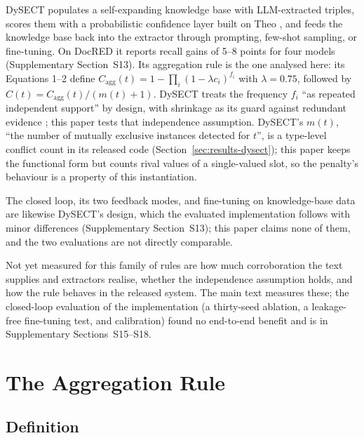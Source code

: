 \documentclass[preprint,12pt,authoryear]{elsarticle}
\begin{document}
DySECT \citep{aminnaseri2026dysect} populates a self-expanding knowledge
base with LLM-extracted triples, scores them with a probabilistic
confidence layer built on Theo \citep{mitchell1989theo}, and feeds the
knowledge base back into the extractor through prompting, few-shot
sampling, or fine-tuning. On DocRED it reports recall gains of 5--8
points for four models (Supplementary Section~S13). Its aggregation rule
is the one analysed here: its Equations 1--2 define
$C_{\mathrm{agg}}(t) = 1 - \prod_i (1-\lambda c_i)^{f_i}$ with
$\lambda=0.75$, followed by $C(t) = C_{\mathrm{agg}}(t)/(m(t)+1)$.
DySECT treats the frequency $f_i$ ``as repeated independent support'' by
design, with shrinkage as its guard against redundant evidence
\citep[Sect.~2.2]{aminnaseri2026dysect}; this paper tests that
independence assumption. DySECT's $m(t)$, ``the number of mutually
exclusive instances detected for $t$'', is a type-level conflict count
in its released code (Section~\ref{sec:results-dysect}); this paper
keeps the functional form but counts rival values of a single-valued
slot, so the penalty's behaviour is a property of this instantiation.

The closed loop, its two feedback modes, and fine-tuning on
knowledge-base data are likewise DySECT's design, which the evaluated
implementation follows with minor differences (Supplementary
Section~S13); this paper claims none of them, and the two evaluations
are not directly comparable.

Not yet measured for this family of rules are how much corroboration the
text supplies and extractors realise, whether the independence
assumption holds, and how the rule behaves in the released system. The
main text measures these; the closed-loop evaluation of the
implementation (a thirty-seed ablation, a leakage-free fine-tuning test,
and calibration) found no end-to-end benefit and is in Supplementary
Sections~S15--S18.

\section{The Aggregation Rule}
\label{sec:formal-analysis}

\subsection{Definition}
\label{sec:formal-analysis-definition}
\end{document}
